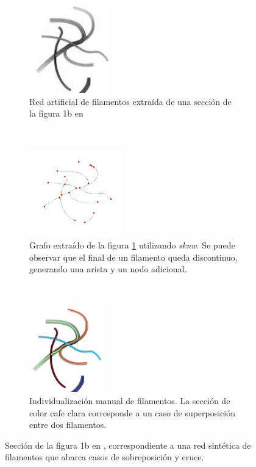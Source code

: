  \begin{figure}[h!]
    \centering
    \begin{subfigure}[t]{0.3\textwidth}
        \centering
        \includegraphics[height=1.5in]{benchImages/define-weighted-4.png}
        \caption{Red artificial de filamentos extra\'ida de una secci\'on de la figura 1b en \cite{breuer2015define}}
        \label{fig:synth-Define-4-original}
    \end{subfigure}%
    ~ 
    \begin{subfigure}[t]{0.3\textwidth}
        \centering
        \includegraphics[height=1.5in]{benchImages/define-weighted-4_inv_graph_labeled_thick.png}
        \caption{Grafo extra\'ido de la figura \ref{fig:synth-Define-4-original} utilizando {\it sknw}. Se puede observar que el final de un filamento queda discontinuo, generando una arista y un nodo adicional.}
        \label{fig:synth-Define-4-graph}
    \end{subfigure}
    ~ 
    \begin{subfigure}[t]{0.3\textwidth}
        \centering
        \includegraphics[height=1.5in]{benchImages/define-weighted-4-groundTruth.png}
        \caption{Individualizaci\'on manual de filamentos. La secci\'on de color cafe clara corresponde a un caso de superposici\'on entre dos filamentos.}
        \label{fig:synth-Define-4-graph-gt}
    \end{subfigure}
    \caption{Secci\'on de la figura 1b en \cite{breuer2015define}, correspondiente a una red sint\'etica de filamentos que abarca casos de sobreposici\'on y cruce.}
    \label{fig:synth-Define-4}
\end{figure}

